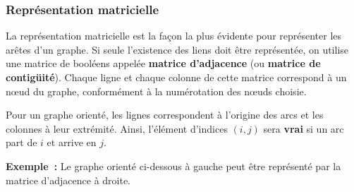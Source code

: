 		\subsubsection{Représentation matricielle}

			La représentation matricielle est la façon la plus évidente 
			pour représenter les arêtes d'un graphe. Si seule
			l'existence des liens doit être représentée, on utilise une 
			matrice de booléens appelée \textbf{matrice d'adjacence}
			(ou \textbf{matrice de contigüité}). Chaque ligne et chaque 
			colonne de cette matrice correspond à un n{\oe}ud du
			graphe, conformément à la numérotation des n{\oe}uds choisie.

			Pour un graphe orienté, les lignes correspondent à l'origine des 
			arcs et les colonnes à leur extrémité. Ainsi, l'élément
			d'indices $(i, j)$ sera \textbf{vrai} si un arc 
			part de $i$ et arrive en $j$.

			\textbf{Exemple~:} Le graphe orienté ci-dessous à gauche 
			peut être représenté par la matrice d'adjacence à droite.

